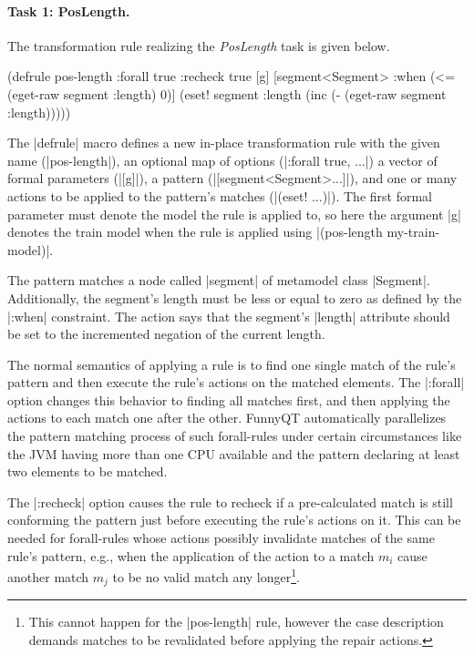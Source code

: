 \documentclass[submission]{eptcs}
\newcommand{\code}{\clojureinline}
\begin{document}
\paragraph{Task 1: PosLength.}

The transformation rule realizing the \emph{PosLength} task is given below.

\begin{clojurecode}
(defrule pos-length {:forall true :recheck true} [g]
  [segment<Segment>
   :when (<= (eget-raw segment :length) 0)]
  (eset! segment :length (inc (- (eget-raw segment :length)))))
\end{clojurecode}

The \code|defrule| macro defines a new in-place transformation rule with the
given name (\code|pos-length|), an optional map of options
(\code|{:forall true, ...}|) a vector of formal parameters (\code|[g]|), a
pattern (\code|[segment<Segment>...]|), and one or many actions to be applied
to the pattern's matches (\code|(eset! ...)|).  The first formal parameter must
denote the model the rule is applied to, so here the argument \code|g| denotes
the train model when the rule is applied using
\code|(pos-length my-train-model)|.

The pattern matches a node called \code|segment| of metamodel class
\code|Segment|.  Additionally, the segment's length must be less or equal to
zero as defined by the \code|:when| constraint.  The action says that the
segment's \code|length| attribute should be set to the incremented negation of
the current length.

The normal semantics of applying a rule is to find one single match of the
rule's pattern and then execute the rule's actions on the matched elements.
The \code|:forall| option changes this behavior to finding all matches first,
and then applying the actions to each match one after the other.  FunnyQT
automatically parallelizes the pattern matching process of such forall-rules
under certain circumstances like the JVM having more than one CPU available and
the pattern declaring at least two elements to be matched.

The \code|:recheck| option causes the rule to recheck if a pre-calculated match
is still conforming the pattern just before executing the rule's actions on it.
This can be needed for forall-rules whose actions possibly invalidate matches
of the same rule's pattern, e.g., when the application of the action to a match
\(m_i\)
cause another match \(m_j\)
to be no valid match any longer\footnote{This cannot happen for the
  \code|pos-length| rule, however the case description demands matches to be
  revalidated before applying the repair actions.}.
\end{document}
